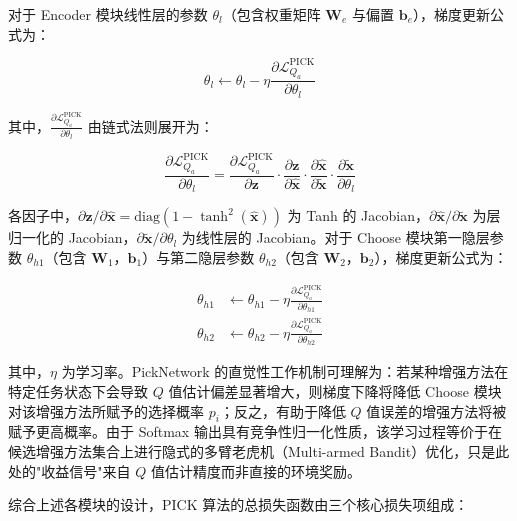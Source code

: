 对于 Encoder 模块线性层的参数 $\theta_l$（包含权重矩阵 $\mathbf{W}_e$ 与偏置 $\mathbf{b}_e$），梯度更新公式为：

\begin{equation}
    \theta_l \leftarrow \theta_l - \eta \frac{\partial \mathcal{L}_{Q_a}^{\text{PICK}}}{\partial \theta_l}
\end{equation}

其中，$\frac{\partial \mathcal{L}_{Q_a}^{\text{PICK}}}{\partial \theta_l}$ 由链式法则展开为：

\begin{equation}
    \frac{\partial \mathcal{L}_{Q_a}^{\text{PICK}}}{\partial \theta_l} = \frac{\partial \mathcal{L}_{Q_a}^{\text{PICK}}}{\partial \mathbf{z}} \cdot \frac{\partial \mathbf{z}}{\partial \hat{\mathbf{x}}} \cdot \frac{\partial \hat{\mathbf{x}}}{\partial \tilde{\mathbf{x}}} \cdot \frac{\partial \tilde{\mathbf{x}}}{\partial \theta_l}
\end{equation}

各因子中，$\partial \mathbf{z}/\partial \hat{\mathbf{x}} = \mathrm{diag}(1 - \tanh^2(\hat{\mathbf{x}}))$ 为 Tanh 的 Jacobian，$\partial \hat{\mathbf{x}}/\partial \tilde{\mathbf{x}}$ 为层归一化的 Jacobian，$\partial \tilde{\mathbf{x}}/\partial \theta_l$ 为线性层的 Jacobian。对于 Choose 模块第一隐层参数 $\theta_{h1}$（包含 $\mathbf{W}_1$，$\mathbf{b}_1$）与第二隐层参数 $\theta_{h2}$（包含 $\mathbf{W}_2$，$\mathbf{b}_2$），梯度更新公式为：

\begin{equation}
    \begin{aligned}
        \theta_{h1} &\leftarrow \theta_{h1} - \eta \frac{\partial \mathcal{L}_{Q_a}^{\text{PICK}}}{\partial \theta_{h1}} \\[4pt]
        \theta_{h2} &\leftarrow \theta_{h2} - \eta \frac{\partial \mathcal{L}_{Q_a}^{\text{PICK}}}{\partial \theta_{h2}}
    \end{aligned}
    \label{eq:picknets_update}
\end{equation}

其中，$\eta$ 为学习率。PickNetwork 的直觉性工作机制可理解为：若某种增强方法在特定任务状态下会导致 $Q$ 值估计偏差显著增大，则梯度下降将降低 Choose 模块对该增强方法所赋予的选择概率 $p_i$；反之，有助于降低 $Q$ 值误差的增强方法将被赋予更高概率。由于 Softmax 输出具有竞争性归一化性质，该学习过程等价于在候选增强方法集合上进行隐式的多臂老虎机（Multi-armed Bandit）优化，只是此处的"收益信号"来自 $Q$ 值估计精度而非直接的环境奖励。

综合上述各模块的设计，PICK 算法的总损失函数由三个核心损失项组成：

